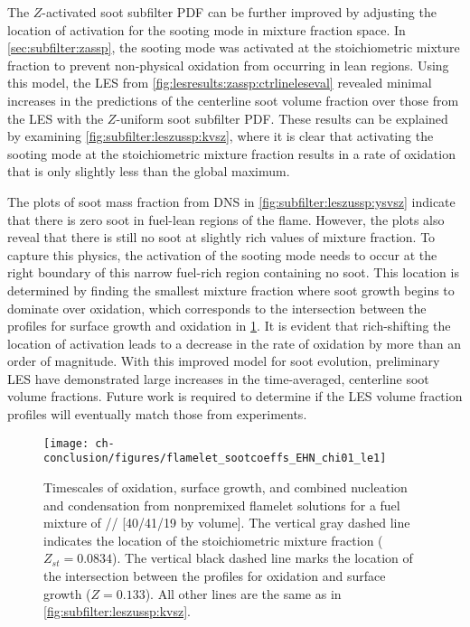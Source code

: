 The $Z$-activated soot subfilter PDF can be further improved by adjusting the location of activation for the sooting mode in mixture fraction space. In \cref{sec:subfilter:zassp}, the sooting mode was activated at the stoichiometric mixture fraction to prevent non-physical oxidation from occurring in lean regions. Using this model, the LES from \cref{fig:lesresults:zassp:ctrlineleseval} revealed minimal increases in the predictions of the centerline soot volume fraction over those from the LES with the $Z$-uniform soot subfilter PDF. These results can be explained by examining \cref{fig:subfilter:leszussp:kvsz}, where it is clear that activating the sooting mode at the stoichiometric mixture fraction results in a rate of oxidation that is only slightly less than the global maximum.

The plots of soot mass fraction from DNS in \cref{fig:subfilter:leszussp:ysvsz} indicate that there is zero soot in fuel-lean regions of the flame. However, the plots also reveal that there is still no soot at slightly rich values of mixture fraction. To capture this physics, the activation of the sooting mode needs to occur at the right boundary of this narrow fuel-rich region containing no soot. This location is determined by finding the smallest mixture fraction where soot growth begins to dominate over oxidation, which corresponds to the intersection between the profiles for surface growth and oxidation in \cref{fig:conclusion:future:zassp:shiftedz}. It is evident that rich-shifting the location of activation leads to a decrease in the rate of oxidation by more than an order of magnitude. With this improved model for soot evolution, preliminary LES have demonstrated large increases in the time-averaged, centerline soot volume fractions. Future work is required to determine if the LES volume fraction profiles will eventually match those from experiments.
\begin{figure}[htb]
  \centering
  \texttt{[image: ch-conclusion/figures/flamelet\_sootcoeffs\_EHN\_chi01\_le1]}
  \caption[Shifted Activation of ZASSP]{Timescales of oxidation, surface growth, and combined nucleation and condensation from nonpremixed flamelet solutions for a fuel mixture of // [40/41/19 by volume]. The vertical gray dashed line indicates the location of the stoichiometric mixture fraction ($Z_{st} = 0.0834$). The vertical black dashed line marks the location of the intersection between the profiles for oxidation and surface growth ($Z = 0.133$). All other lines are the same as in \cref{fig:subfilter:leszussp:kvsz}.}
  \label{fig:conclusion:future:zassp:shiftedz}
\end{figure}


